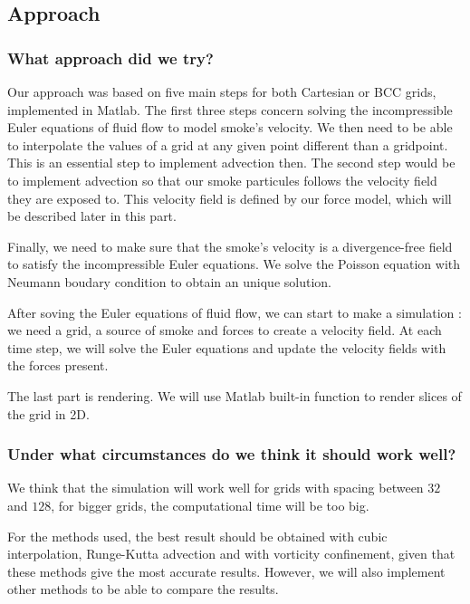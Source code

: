 \documentclass[accepted,single]{gipaper}
\begin{document}
\subsection{Approach}

\subsubsection{What approach did we try?}

Our approach was based on five main steps for both Cartesian or BCC grids, implemented in Matlab. The first three steps concern solving the incompressible Euler equations of fluid flow to model smoke's velocity.  We then need to be able to interpolate the values of a grid at any given point different than a gridpoint. This is an essential step to implement advection then.
The second step would be to implement advection so that our smoke particules follows the velocity field they are exposed to. This velocity field is defined by our force model, which will be described later in this part.

Finally, we need to make sure that the smoke's velocity is a divergence-free field to satisfy the incompressible Euler equations. We solve the Poisson equation with Neumann boudary condition to obtain an unique solution. 

After soving the Euler equations of fluid flow, we can start to make a simulation : we need a grid, a source of smoke and forces to create a velocity field. At each time step, we will solve the Euler equations and update the velocity fields with the forces present.

The last part is rendering. We will use Matlab built-in function to render slices of the grid in 2D.


\subsubsection{Under what circumstances do we think it should work well?}

We think that the simulation will work well for grids with spacing between $32$ and $128$, for bigger grids, the computational time will be too big.

For the methods used, the best result should be obtained with cubic interpolation, Runge-Kutta advection and with vorticity confinement, given that these methods give the most accurate results. However, we will also implement other methods to be able to compare the results.
\end{document}
